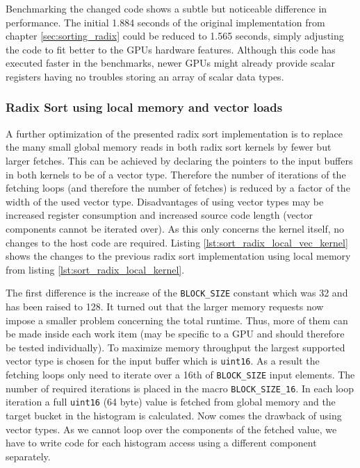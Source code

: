 Benchmarking the changed code shows a subtle but noticeable difference in performance. The initial 1.884 seconds of the original implementation from chapter \ref{sec:sorting_radix} could be reduced to 1.565 seconds, simply adjusting the code to fit better to the GPUs hardware features. Although this code has executed faster in the benchmarks, newer GPUs might already provide scalar registers having no troubles storing an array of scalar data types.

\subsubsection{Radix Sort using local memory and vector loads}
\label{sec:sorting_radix_local_vec}

A further optimization of the presented radix sort implementation is to replace the many small global memory reads in both radix sort kernels by fewer but larger fetches. This can be achieved by declaring the pointers to the input buffers in both kernels to be of a vector type. Therefore the number of iterations of the fetching loops (and therefore the number of fetches) is reduced by a factor of the width of the used vector type. Disadvantages of using vector types may be increased register consumption and increased source code length (vector components cannot be iterated over).
As this only concerns the kernel itself, no changes to the host code are required. Listing \ref{lst:sort_radix_local_vec_kernel} shows the changes to the previous radix sort implementation using local memory from listing \ref{lst:sort_radix_local_kernel}.



The first difference is the increase of the \lstinline!BLOCK_SIZE! constant which was 32 and has been raised to 128. It turned out that the larger memory requests now impose a smaller problem concerning the total runtime. Thus, more of them can be made inside each work item (may be specific to a GPU and should therefore be tested individually). To maximize memory throughput the largest supported vector type is chosen for the input buffer which is \lstinline!uint16!. As a result the fetching loops only need to iterate over a 16th of \lstinline!BLOCK_SIZE! input elements. The number of required iterations is placed in the macro \lstinline!BLOCK_SIZE_16!. In each loop iteration a full \lstinline!uint16! (64 byte) value is fetched from global memory and the target bucket in the histogram is calculated. Now comes the drawback of using vector types. As we cannot loop over the components of the fetched value, we have to write code for each histogram access using a different component separately.

